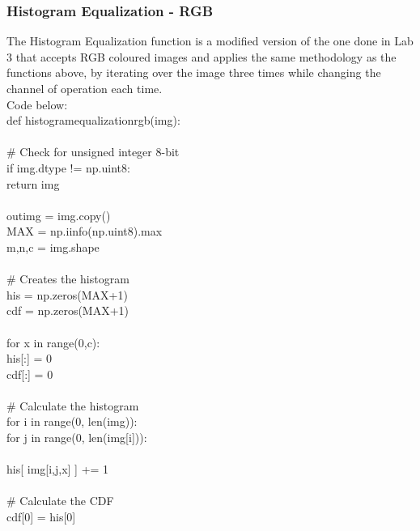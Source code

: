\documentclass{article}
\begin{document}
	\subsubsection{Histogram Equalization - RGB}
	
	The Histogram Equalization function is a modified version of the one done in Lab 3 that accepts RGB coloured images and applies the same methodology as the functions above, by iterating over the image three times while changing the channel of operation each time.\\
	
	Code below:\\
	
	\noindent def histogram\textunderscore equalization\textunderscore rgb(img):\\
	\\
	\indent \# Check for unsigned integer 8-bit\\
	\indent if img.dtype != np.uint8:\\
	\indent \indent return img\\
	\\
	\indent out\textunderscore img = img.copy()\\
	\indent MAX = np.iinfo(np.uint8).max\\
	\indent m,n,c = img.shape\\
	\\
	\indent \# Creates the histogram\\
	\indent his = np.zeros(MAX+1)\\
	\indent cdf = np.zeros(MAX+1)\\
	\\
	\indent for x in range(0,c):\\
	\indent \indent his[:] = 0\\
	\indent \indent cdf[:] = 0\\
	\\   
	\indent \indent \# Calculate the histogram\\
	\indent \indent for i in range(0, len(img)):\\
	\indent \indent \indent for j in range(0, len(img[i])):\\
	\\
	\indent \indent \indent \indent his[ img[i,j,x] ] += 1\\
	\\
	\indent \indent \# Calculate the CDF   \\ 
	\indent \indent cdf[0] = his[0]\\
	\\
\end{document}
